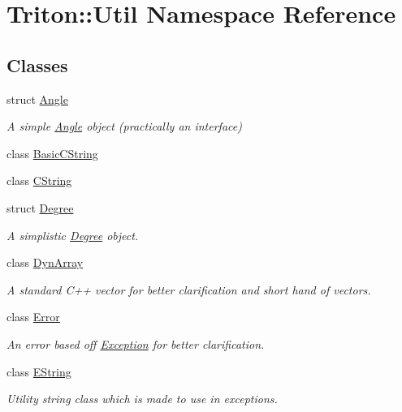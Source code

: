 \hypertarget{namespace_triton_1_1_util}{}\section{Triton\+:\+:Util Namespace Reference}
\label{namespace_triton_1_1_util}
\subsection*{Classes}
\begin{DoxyCompactItemize}
\item 
struct \hyperlink{struct_triton_1_1_util_1_1_angle}{Angle}
\begin{DoxyCompactList}\small\item\em A simple \hyperlink{struct_triton_1_1_util_1_1_angle}{Angle} object (practically an interface) \end{DoxyCompactList}\item 
class \hyperlink{class_triton_1_1_util_1_1_basic_c_string}{Basic\+C\+String}
\item 
class \hyperlink{class_triton_1_1_util_1_1_c_string}{C\+String}
\item 
struct \hyperlink{struct_triton_1_1_util_1_1_degree}{Degree}
\begin{DoxyCompactList}\small\item\em A simplistic \hyperlink{struct_triton_1_1_util_1_1_degree}{Degree} object. \end{DoxyCompactList}\item 
class \hyperlink{class_triton_1_1_util_1_1_dyn_array}{Dyn\+Array}
\begin{DoxyCompactList}\small\item\em A standard C++ vector for better clarification and short hand of vectors. \end{DoxyCompactList}\item 
class \hyperlink{class_triton_1_1_util_1_1_error}{Error}
\begin{DoxyCompactList}\small\item\em An error based off \hyperlink{class_triton_1_1_util_1_1_exception}{Exception} for better clarification. \end{DoxyCompactList}\item 
class \hyperlink{class_triton_1_1_util_1_1_e_string}{E\+String}
\begin{DoxyCompactList}\small\item\em Utility string class which is made to use in exceptions. \end{DoxyCompactList}\item 

\end{DoxyCompactItemize}
